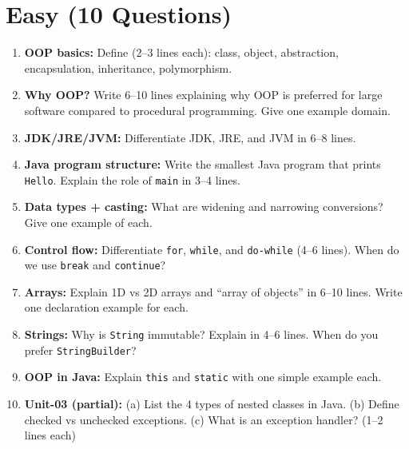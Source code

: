 \documentclass[11pt,a4paper]{article}
\begin{document}
\section*{Easy (10 Questions)}
\begin{enumerate}[label=E\arabic*., leftmargin=*]
  \item \textbf{OOP basics:} Define (2--3 lines each): class, object, abstraction, encapsulation, inheritance, polymorphism.

  \item \textbf{Why OOP?} Write 6--10 lines explaining why OOP is preferred for large software compared to procedural programming.
    Give one example domain.

  \item \textbf{JDK/JRE/JVM:} Differentiate JDK, JRE, and JVM in 6--8 lines.

  \item \textbf{Java program structure:} Write the smallest Java program that prints \texttt{Hello}.
    Explain the role of \texttt{main} in 3--4 lines.

  \item \textbf{Data types + casting:} What are widening and narrowing conversions? Give one example of each.

  \item \textbf{Control flow:} Differentiate \texttt{for}, \texttt{while}, and \texttt{do-while} (4--6 lines).
    When do we use \texttt{break} and \texttt{continue}?

  \item \textbf{Arrays:} Explain 1D vs 2D arrays and ``array of objects'' in 6--10 lines.
    Write one declaration example for each.

  \item \textbf{Strings:} Why is \texttt{String} immutable? Explain in 4--6 lines.
    When do you prefer \texttt{StringBuilder}?

  \item \textbf{OOP in Java:} Explain \texttt{this} and \texttt{static} with one simple example each.

  \item \textbf{Unit-03 (partial):} (a) List the 4 types of nested classes in Java. (b) Define checked vs unchecked exceptions.
    (c) What is an exception handler? (1--2 lines each)
\end{enumerate}
\end{document}
